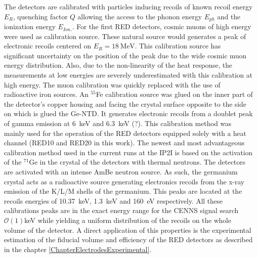 The detectors are calibrated with particles inducing recoils of known recoil energy $E_R$, quenching factor $Q$ allowing the access to the phonon energy $E_{ph}$ and the ionization energy $E_{Ion.}$.
For the first RED detectors, cosmic muons of high energy were used as calibration source. These natural source would generates a peak of electronic recoils centered on $E_R =  \SI{18}{\mega\eV}$. This calibration source has significant uncertainty on the position of the peak due to the wide cosmic muon energy distribution. Also, due to the non-linearity of the heat response, the measurements at low energies are severely underestimated with this calibration at high energy.
The muon calibration was quickly replaced with the use of radioactive iron  sources.
An $^{55}$Fe calibration source was glued on the inner part of the detector's copper housing and facing the crystal surface opposite to the side on which is glued the Ge-NTD. It generates electronic recoils from a doublet peak of gamma emission at \SI{6}{\kilo\eV} and \SI{6.3}{\kilo\eV} (?). This calibration method was mainly used for the operation of the RED detectors equipped solely with a heat channel (RED10 and RED20 in this work).
The newest and most advantageous calibration method used in the current runs at the IP2I is based on the activation of the $^{71}$Ge in the crystal of the detectors with thermal neutrons. The detectors are activated with an intense AmBe neutron source. As such, the germanium crystal acts as a radioactive source generating electronics recoils from the x-ray emission of the K/L/M shells of the germanium. This peaks are located at the recoils energies of \SI{10.37}{\kilo\eV}, \SI{1.3}{\kilo\eV} and \SI{160}{\eV} respectively. All these calibrations peaks are in the exact energy range for the CENNS signal search $\mathcal{O}(1)$\si{\kilo\eV} while yielding a uniform distribution of the recoils on the whole volume of the detector. A direct application of this properties is the experimental estimation of the fiducial volume and efficiency of the RED detectors as described in the chapter \ref{ChapterElectrodesExperimental}.


